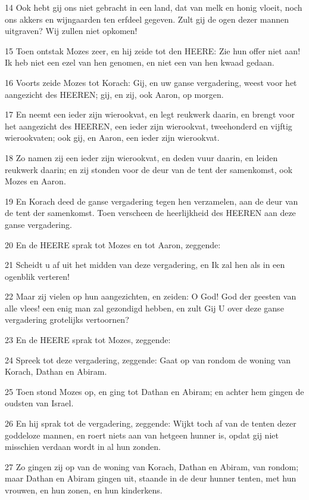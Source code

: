 \par 14 Ook hebt gij ons niet gebracht in een land, dat van melk en honig vloeit, noch ons akkers en wijngaarden ten erfdeel gegeven. Zult gij de ogen dezer mannen uitgraven? Wij zullen niet opkomen!
\par 15 Toen ontstak Mozes zeer, en hij zeide tot den HEERE: Zie hun offer niet aan! Ik heb niet een ezel van hen genomen, en niet een van hen kwaad gedaan.
\par 16 Voorts zeide Mozes tot Korach: Gij, en uw ganse vergadering, weest voor het aangezicht des HEEREN; gij, en zij, ook Aaron, op morgen.
\par 17 En neemt een ieder zijn wierookvat, en legt reukwerk daarin, en brengt voor het aangezicht des HEEREN, een ieder zijn wierookvat, tweehonderd en vijftig wierookvaten; ook gij, en Aaron, een ieder zijn wierookvat.
\par 18 Zo namen zij een ieder zijn wierookvat, en deden vuur daarin, en leiden reukwerk daarin; en zij stonden voor de deur van de tent der samenkomst, ook Mozes en Aaron.
\par 19 En Korach deed de ganse vergadering tegen hen verzamelen, aan de deur van de tent der samenkomst. Toen verscheen de heerlijkheid des HEEREN aan deze ganse vergadering.
\par 20 En de HEERE sprak tot Mozes en tot Aaron, zeggende:
\par 21 Scheidt u af uit het midden van deze vergadering, en Ik zal hen als in een ogenblik verteren!
\par 22 Maar zij vielen op hun aangezichten, en zeiden: O God! God der geesten van alle vlees! een enig man zal gezondigd hebben, en zult Gij U over deze ganse vergadering grotelijks vertoornen?
\par 23 En de HEERE sprak tot Mozes, zeggende:
\par 24 Spreek tot deze vergadering, zeggende: Gaat op van rondom de woning van Korach, Dathan en Abiram.
\par 25 Toen stond Mozes op, en ging tot Dathan en Abiram; en achter hem gingen de oudsten van Israel.
\par 26 En hij sprak tot de vergadering, zeggende: Wijkt toch af van de tenten dezer goddeloze mannen, en roert niets aan van hetgeen hunner is, opdat gij niet misschien verdaan wordt in al hun zonden.
\par 27 Zo gingen zij op van de woning van Korach, Dathan en Abiram, van rondom; maar Dathan en Abiram gingen uit, staande in de deur hunner tenten, met hun vrouwen, en hun zonen, en hun kinderkens.
